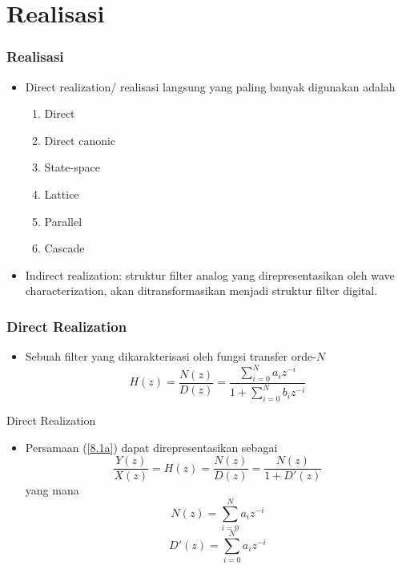 \documentclass[pdflatex,compress,mathserif]{beamer}
\begin{document}
\section{Realisasi}

\begin{frame}
	\frametitle{Realisasi}
	\begin{itemize}
		\item Direct realization/ realisasi langsung yang paling banyak digunakan adalah
		\begin{enumerate}
			\item Direct
			\item Direct canonic
			\item State-space
			\item Lattice
			\item Parallel
			\item Cascade
		\end{enumerate}
		\item Indirect realization: struktur filter analog yang direpresentasikan oleh wave characterization, akan ditransformasikan menjadi struktur filter digital.
	\end{itemize}
\end{frame}

\begin{frame}
	\frametitle{Direct Realization}
	\begin{itemize}
		\item Sebuah filter yang dikarakterisasi oleh fungsi transfer orde-$ N $
		\begin{equation}\label{8.1a}
			H(z) = \frac{N(z)}{D(z)} = \frac{\sum\limits_{i=0}^{N}a_i z^{-i}}{1 + \sum\limits_{i=0}^{N}b_i z^{-i}}
		\end{equation}
	\end{itemize}
\end{frame}

\begin{frame}{Direct Realization}
	\begin{itemize}
		\item Persamaan (\ref{8.1a}) dapat direpresentasikan sebagai
		\begin{equation}\label{8.1b}
			\frac{Y(z)}{X(z)} = H(z) = \frac{N(z)}{D(z)} = \frac{N(z)}{1 + D'(z)}
		\end{equation}
		yang mana
		\begin{equation}\label{8.2a}
			N(z) = \sum\limits_{i=0}^N a_i z^{-i}
		\end{equation}
		\begin{equation}\label{8.2b}
			D'(z) = \sum\limits_{i=0}^N a_i z^{-i}
		\end{equation}
	\end{itemize}
\end{frame}
\end{document}
